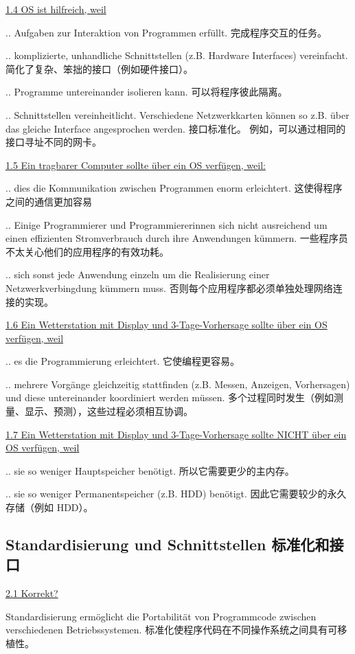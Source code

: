 \documentclass[fleqn]{article}
\begin{document}
\noindent\uline{1.4 OS ist hilfreich, weil}
 
.. Aufgaben zur Interaktion von Programmen erfüllt. 完成程序交互的任务。
 
.. komplizierte, unhandliche Schnittstellen (z.B. Hardware Interfaces) vereinfacht.
简化了复杂、笨拙的接口（例如硬件接口）。

.. Programme untereinander isolieren kann.
可以将程序彼此隔离。

.. Schnittstellen vereinheitlicht. Verschiedene Netzwerkkarten können so z.B. über das gleiche Interface angesprochen werden.
接口标准化。 例如，可以通过相同的接口寻址不同的网卡。

\noindent\uline{1.5 Ein tragbarer Computer sollte über ein OS verfügen, weil:}

.. dies die Kommunikation zwischen Programmen enorm erleichtert.
这使得程序之间的通信更加容易

.. Einige Programmierer und Programmiererinnen sich nicht ausreichend um einen effizienten Stromverbrauch durch ihre Anwendungen kümmern.
一些程序员不太关心他们的应用程序的有效功耗。

.. sich sonst jede Anwendung einzeln um die Realisierung einer Netzwerkverbingdung kümmern muss.
否则每个应用程序都必须单独处理网络连接的实现。

\noindent\uline{1.6 Ein Wetterstation mit Display und 3-Tage-Vorhersage sollte über ein OS verfügen, weil}

.. es die Programmierung erleichtert. 它使编程更容易。

.. mehrere Vorgänge gleichzeitig stattfinden (z.B. Messen, Anzeigen, Vorhersagen) und diese untereinander koordiniert werden müssen.
多个过程同时发生（例如测量、显示、预测），这些过程必须相互协调。

\noindent\uline{1.7 Ein Wetterstation mit Display und 3-Tage-Vorhersage sollte NICHT über ein OS verfügen, weil}

.. sie so weniger Hauptspeicher benötigt. 所以它需要更少的主内存。

.. sie so weniger Permanentspeicher (z.B. HDD) benötigt. 因此它需要较少的永久存储（例如 HDD）。

\subsection{Standardisierung und Schnittstellen 标准化和接口}

\noindent\uline{2.1 Korrekt?}

Standardisierung ermöglicht die Portabilität von Programmcode zwischen verschiedenen Betriebssystemen.
标准化使程序代码在不同操作系统之间具有可移植性。
\end{document}
